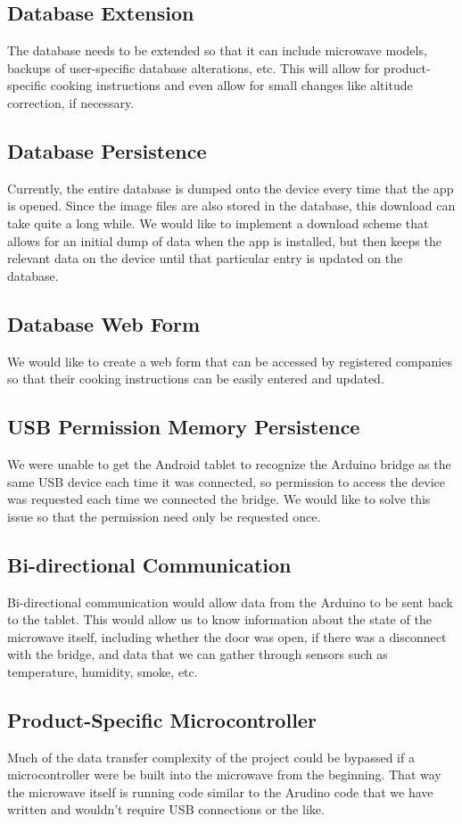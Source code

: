 \documentclass[10pt,journal,letterpaper,twocolumn]{IEEEtran}
\begin{document}
\subsection*{Database Extension}
The database needs to be extended so that it can include microwave models, backups of user-specific database alterations, etc. This will allow for product-specific cooking instructions and even allow for small changes like altitude correction, if necessary.
\subsection*{Database Persistence}
Currently, the entire database is dumped onto the device every time that the app is opened. Since the image files are also stored in the database, this download can take quite a long while. We would like to implement a download scheme that allows for an initial dump of data when the app is installed, but then keeps the relevant data on the device until that particular entry is updated on the database.
\subsection*{Database Web Form}
We would like to create a web form that can be accessed by registered companies so that their cooking instructions can be easily entered and updated.
\subsection*{USB Permission Memory Persistence}
We were unable to get the Android tablet to recognize the Arduino bridge as the same USB device each time it was connected, so permission to access the device was requested each time we connected the bridge. We would like to solve this issue so that the permission need only be requested once. 
\subsection*{Bi-directional Communication}
Bi-directional communication would allow data from the Arduino to be sent back to the tablet. This would allow us to know information about the state of the microwave itself, including whether the door was open, if there was a disconnect with the bridge, and data that we can gather through sensors such as temperature, humidity, smoke, etc.
\subsection*{Product-Specific Microcontroller}
Much of the data transfer complexity of the project could be bypassed if a microcontroller were be built into the microwave from the beginning. That way the microwave itself is running code similar to the Arudino code that we have written and wouldn't require USB connections or the like.
\end{document}
